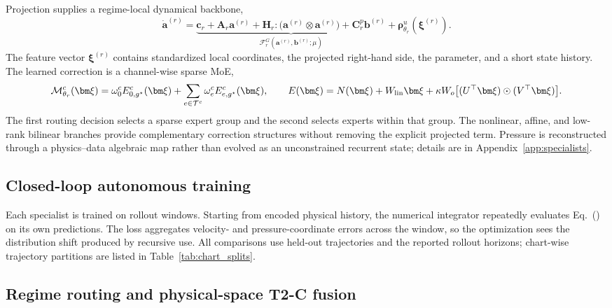 Projection supplies a regime-local dynamical backbone,
\begin{equation}
  \dot{\bm a}^{(r)}=
  \underbrace{\bm c_r+\bm A_r\bm a^{(r)}+
  \bm H_r:\bigl(\bm a^{(r)}\otimes\bm a^{(r)}\bigr)+
  \bm C^p_r\bm b^{(r)}}_{\mathcal F_r^{G}(\bm a^{(r)},\bm b^{(r)};\mu)}
  +\bm\rho^u_{\theta_r}(\bm\xi^{(r)}).
  \label{eq:main_specialist}
\end{equation}
The feature vector $\bm\xi^{(r)}$ contains standardized local coordinates, the projected right-hand side, the parameter, and a short state history. The learned correction is a channel-wise sparse MoE,
\begin{equation}
  \mathcal M^c_{\theta_r}(\bm\xi)=
  \omega^c_0 E^c_{0,g^\star}(\bm\xi)+
  \sum_{e\in\mathcal T^c}\omega^c_e E^c_{e,g^\star}(\bm\xi),
  \qquad
  E(\bm\xi)=N(\bm\xi)+W_{\rm lin}\bm\xi+
  \kappa W_o\bigl[(U^\top\bm\xi)\odot(V^\top\bm\xi)\bigr].
  \label{eq:main_inner_moe}
\end{equation}
The first routing decision selects a sparse expert group and the second selects experts within that group. The nonlinear, affine, and low-rank bilinear branches provide complementary correction structures without removing the explicit projected term. Pressure is reconstructed through a physics--data algebraic map rather than evolved as an unconstrained recurrent state; details are in Appendix~\ref{app:specialists}.

\subsection{Closed-loop autonomous training}

Each specialist is trained on rollout windows. Starting from encoded physical history, the numerical integrator repeatedly evaluates Eq.~() on its own predictions. The loss aggregates velocity- and pressure-coordinate errors across the window, so the optimization sees the distribution shift produced by recursive use. All comparisons use held-out trajectories and the reported rollout horizons; chart-wise trajectory partitions are listed in Table~\ref{tab:chart_splits}.

\subsection{Regime routing and physical-space T2-C fusion}

